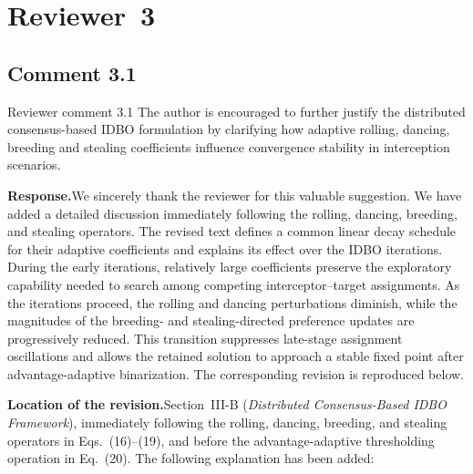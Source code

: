 \documentclass[11pt]{article}
\newcommand{\rsp}{\medskip\noindent\textbf{Response.}\quad}
\newcommand{\loc}{\medskip\noindent\textbf{Location of the revision.}\quad}
\begin{document}
\clearpage

\section*{Reviewer~3}


\subsection*{Comment 3.1}

\begin{reviewercomment}{Reviewer comment 3.1}
The author is encouraged to further justify the distributed consensus-based
IDBO formulation by clarifying how adaptive rolling, dancing, breeding and
stealing coefficients influence convergence stability in interception
scenarios.
\end{reviewercomment}

\rsp We sincerely thank the reviewer for this valuable suggestion. 
We have added a detailed discussion immediately following the
rolling, dancing, breeding, and stealing operators. The revised text defines
a common linear decay schedule for their adaptive coefficients and explains
its effect over the IDBO iterations. During the early iterations, relatively
large coefficients preserve the exploratory capability needed to search
among competing interceptor--target assignments. As the iterations proceed,
the rolling and dancing perturbations diminish, while the magnitudes of the
breeding- and stealing-directed preference updates are progressively reduced.
This transition suppresses late-stage assignment oscillations and allows
the retained solution to approach a stable fixed point after
advantage-adaptive binarization.
The corresponding revision is reproduced below.


\loc Section~III-B (\emph{Distributed Consensus-Based IDBO Framework}),
immediately following the rolling, dancing, breeding, and stealing operators
in Eqs.~(16)--(19), and before the advantage-adaptive thresholding operation
in Eq.~(20). The following explanation has been added:
\end{document}
